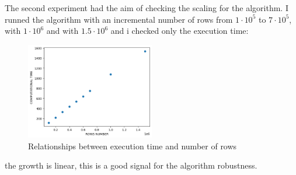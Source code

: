 The second experiment had the aim of checking the scaling for the algorithm. I runned the algorithm with an incremental number of rows from $1 \cdot 10^5$ to $7 \cdot 10^5$, with $1 \cdot 10^6$ and with $1.5 \cdot 10^6$ and i checked only the execution time:
\begin{figure}[h]
    \caption{Relationships between execution time and number of rows}
    \centering
    \includegraphics[width=0.5\textwidth]{project_report_src/project_report_images/scaling.png}
\end{figure}
the growth is linear, this is a good signal for the algorithm robustness. 
